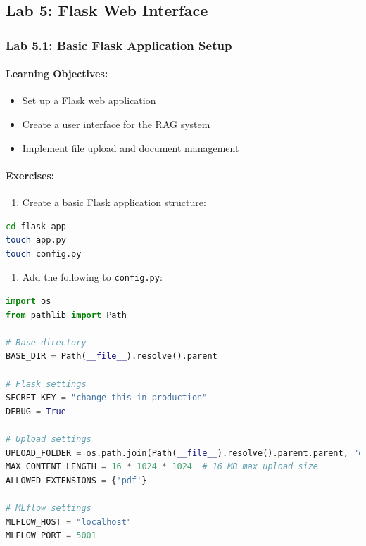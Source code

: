 \documentclass[
  screen,review,acmlarge]{acmart}
\newcommand{\passthrough}[1]{#1}
\providecommand{\tightlist}{%
  \setlength{\itemsep}{0pt}\setlength{\parskip}{0pt}}
\begin{document}
\subsection{Lab 5: Flask Web Interface}\label{lab-5-flask-web-interface}

\subsubsection{Lab 5.1: Basic Flask Application Setup}\label{lab-5.1-basic-flask-application-setup}

\paragraph{Learning Objectives:}\label{learning-objectives-13}

\begin{itemize}
\tightlist
\item
  Set up a Flask web application
\item
  Create a user interface for the RAG system
\item
  Implement file upload and document management
\end{itemize}

\paragraph{Exercises:}\label{exercises-12}

\begin{enumerate}
\def\labelenumi{\arabic{enumi}.}
\tightlist
\item
  Create a basic Flask application structure:
\end{enumerate}

\begin{lstlisting}[language=bash]
cd flask-app
touch app.py
touch config.py
\end{lstlisting}

\begin{enumerate}
\def\labelenumi{\arabic{enumi}.}
\setcounter{enumi}{1}
\tightlist
\item
  Add the following to \passthrough{\lstinline!config.py!}:
\end{enumerate}

\begin{lstlisting}[language=Python]
import os
from pathlib import Path

# Base directory
BASE_DIR = Path(__file__).resolve().parent

# Flask settings
SECRET_KEY = "change-this-in-production"
DEBUG = True

# Upload settings
UPLOAD_FOLDER = os.path.join(Path(__file__).resolve().parent.parent, "data", "pdfs")
MAX_CONTENT_LENGTH = 16 * 1024 * 1024  # 16 MB max upload size
ALLOWED_EXTENSIONS = {'pdf'}

# MLflow settings
MLFLOW_HOST = "localhost"
MLFLOW_PORT = 5001
\end{lstlisting}
\end{document}
